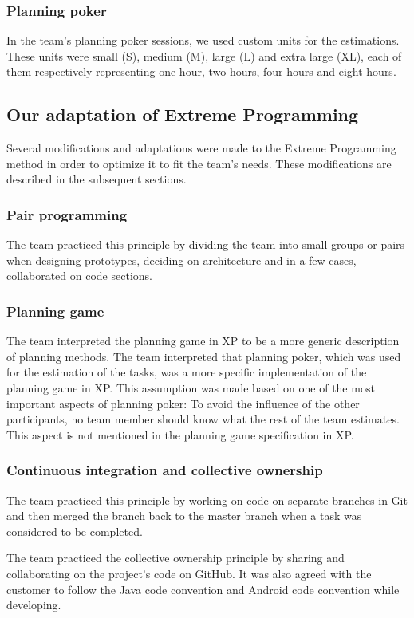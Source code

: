 \subsubsection{Planning poker}
In the team's planning poker sessions, we used custom units for the estimations. These units were small (S), medium (M), large (L) and extra large (XL), each of them respectively representing one hour, two hours, four hours and eight hours.

\subsection{Our adaptation of Extreme Programming}
\label{sec:adapExtremeProgr}
Several modifications and adaptations were made to the Extreme Programming method in order to optimize it to fit the team's needs. These modifications are described in the subsequent sections.

\subsubsection{Pair programming}
The team practiced this principle by dividing the team into small groups or pairs when designing prototypes, deciding on architecture and in a few cases, collaborated on code sections.

\subsubsection{Planning game}
The team interpreted the planning game in XP to be a more generic description of planning methods. The team interpreted that planning poker, which was used for the estimation of the tasks, was a more specific implementation of the planning game in XP. This assumption was made based on one of the most important aspects of planning poker: To avoid the influence of the other participants, no team member should know what the rest of the team estimates. This aspect is not mentioned in the planning game specification in XP.

\subsubsection{Continuous integration and collective ownership}
The team practiced this principle by working on code on separate branches in Git and then merged the branch back to the master branch when a task was considered to be completed.

The team practiced the collective ownership principle by sharing and collaborating on the project's code on GitHub. It was also agreed with the customer to follow the Java code convention and Android code convention while developing.

